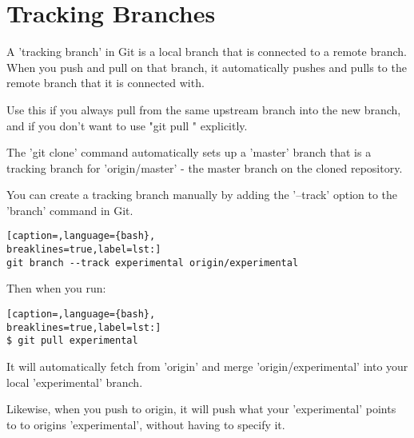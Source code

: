 \section{Tracking Branches}
A 'tracking branch' in Git is a local branch that is connected to a remote
branch. When you push and pull on that branch, it automatically pushes and
pulls to the remote branch that it is connected with.

Use this if you always pull from the same upstream branch into the new branch,
and if you don't want to use "git pull " explicitly.

The 'git clone' command automatically sets up a 'master' branch that is a
tracking branch for 'origin/master' - the master branch on the cloned
repository.

You can create a tracking branch manually by adding the '--track' option to the
'branch' command in Git.
\lstset{basicstyle=\scriptsize, numbers=none, captionpos=b, tabsize=4}
\begin{lstlisting}[caption=,language={bash},
breaklines=true,label=lst:]
git branch --track experimental origin/experimental
\end{lstlisting}

Then when you run:
\lstset{basicstyle=\scriptsize, numbers=none, captionpos=b, tabsize=4}
\begin{lstlisting}[caption=,language={bash},
breaklines=true,label=lst:]
$ git pull experimental
\end{lstlisting}

It will automatically fetch from 'origin' and merge 'origin/experimental' into
your local 'experimental' branch.

Likewise, when you push to origin, it will push what your 'experimental' points
to to origins 'experimental', without having to specify it.
